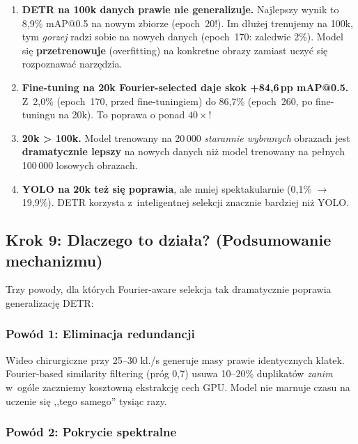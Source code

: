 \begin{enumerate}
    \item \textbf{DETR na 100k danych prawie nie generalizuje.}
          Najlepszy wynik to 8{,}9\% mAP@0.5 na nowym zbiorze (epoch~20!).
          Im dłużej trenujemy na 100k, tym \emph{gorzej} radzi sobie na
          nowych danych (epoch~170: zaledwie 2\%).  Model się
          \textbf{przetrenowuje} (overfitting) na konkretne obrazy zamiast
          uczyć się rozpoznawać narzędzia.

    \item \textbf{Fine-tuning na 20k Fourier-selected daje skok
          +84{,}6\,pp mAP@0.5.}
          Z~2{,}0\% (epoch~170, przed fine-tuningiem) do 86{,}7\%
          (epoch~260, po fine-tuningu na 20k).  To poprawa o ponad
          $40\times$!

    \item \textbf{20k > 100k.}  Model trenowany na 20\,000 \emph{starannie
          wybranych} obrazach jest \textbf{dramatycznie lepszy} na nowych
          danych niż model trenowany na pełnych 100\,000 losowych obrazach.

    \item \textbf{YOLO na 20k też się poprawia}, ale mniej spektakularnie
          (0{,}1\% $\to$ 19{,}9\%).  DETR korzysta z~inteligentnej selekcji
          znacznie bardziej niż YOLO.
\end{enumerate}


\subsection{Krok 9: Dlaczego to działa? (Podsumowanie mechanizmu)}
\label{sec:krok9}

Trzy powody, dla których Fourier-aware selekcja tak dramatycznie poprawia
generalizację DETR:

\subsubsection{Powód 1: Eliminacja redundancji}

Wideo chirurgiczne przy 25--30 kl./s generuje masy prawie identycznych
klatek.  Fourier-based similarity filtering (próg 0{,}7) usuwa 10--20\%
duplikatów \emph{zanim} w~ogóle zaczniemy kosztowną ekstrakcję cech GPU.
Model nie marnuje czasu na uczenie się ,,tego samego'' tysiąc razy.

\subsubsection{Powód 2: Pokrycie spektralne}

